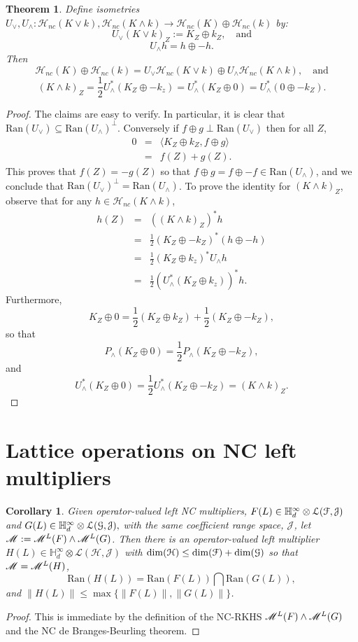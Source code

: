 \documentclass[11pt]{article}
\newcommand{\ba}{\begin{eqnarray}}
\newcommand{\ea}{\end{eqnarray}}
\newcommand{\nn}{\nonumber}
\newcommand{\mr}{\ensuremath{\mathrm}}
\newcommand{\scr}{\ensuremath{\mathscr}}
\newcommand{\mc}{\ensuremath{\mathcal}}
\def\cH{\mathcal{H}}
\def\cG{\mathcal{G}}
\def\bH{\mathbb{H}}
\renewcommand{\H}{\ensuremath{\mathcal{H} }}
\newcommand{\J}{\ensuremath{\mathcal{J} }}
\renewcommand{\L}{\ensuremath{\mathscr{L} }}
\newcommand{\cF}{\ensuremath{\mathcal{F}}}
\newcommand{\ip}[2]{\ensuremath{\langle {#1} , {#2} \rangle}}
\newcommand{\ran}[1]{\ensuremath{\mathrm{Ran} \left( {#1} \right) }}
\numberwithin{equation}{section}
\numberwithin{subsection}{section}
\newtheorem{thm}[subsection]{Theorem}
\newtheorem{cor}[subsection]{Corollary}
\theoremstyle{definition}
\begin{document}
\begin{thm} \label{sumintrkhs}
Define isometries $U _\vee , U _\wedge : \H _{nc} (K \vee k), \H _{nc} (K \wedge k) \rightarrow \H _{nc} (K) \oplus \H _{nc} (k)$ by:
$$ U_\vee (K\vee k)_Z := K_Z \oplus k_Z, \quad \mbox{and} $$ $$ U_\wedge h = h \oplus -h. $$ Then 
$$ \H _{nc} (K) \oplus \H _{nc} (k) = U_\vee \H _{nc} (K \vee k) \oplus U_\wedge \H _{nc} (K \wedge k), \quad \mbox{and}$$  
$$ (K \wedge k )_Z = \frac{1}{2} U_\wedge ^* (K_Z \oplus -k_z) =  U_\wedge ^* (K_Z \oplus 0) =  U_\wedge ^* (0 \oplus -k_Z). $$ 
\end{thm}
\begin{proof}
The claims are easy to verify. In particular, it is clear that $\ran{U_\vee} \subseteq \ran{U_\wedge} ^\perp$. Conversely if $f \oplus g  \perp \ran{U_\vee}$ then for all $Z$,
\ba 0 & = & \ip{K_Z \oplus k_Z}{f \oplus g} \nn \\
& = & f(Z) + g(Z). \nn \ea This proves that $f(Z) = - g(Z)$ so that $f\oplus g = f \oplus -f \in \ran{U_\wedge}$, and we conclude that $\ran{U_\vee} ^\perp = \ran{U_\wedge} $. 
To prove the identity for $(K \wedge k) _Z$, observe that for any $h \in \H _{nc} (K\wedge k)$, 
\ba h(Z) & = & \left( (K \wedge k) _Z \right)^* h \nn \\
& = & \frac{1}{2} \left( K_Z \oplus -k_Z \right) ^* (h \oplus -h) \nn \\
& = & \frac{1}{2} \left( K_Z \oplus k_z \right) ^* U_\wedge h \nn \\
& = & \frac{1}{2} \left(  U_\wedge ^* (K_Z \oplus k_z)  \right) ^* h. \nn \ea 
Furthermore,
$$ K_Z \oplus 0 = \frac{1}{2} (K_Z \oplus k_Z ) + \frac{1}{2} (K_Z \oplus - k_Z), $$ so that
$$ P_\wedge (K_Z \oplus 0) = \frac{1}{2} P_\wedge (K_Z \oplus -k_Z), $$ and 
$$ U_\wedge ^* (K_Z \oplus 0) = \frac{1}{2} U_\wedge ^* (K_Z \oplus -k_Z) = (K\wedge k)_Z. $$ 
\end{proof}

\section{Lattice operations on NC left multipliers} \label{sec:lattice_mult}


\begin{cor}
Given operator-valued left NC multipliers, $F (L) \in \bH ^\infty _d \otimes \mc{L} (\mc{F} , \J) $ and 
$G(L) \in \bH ^\infty _d \otimes \mc{L} (\mc{G} , \J ), $ with the same coefficient range space, $\J$, let $\scr{M} := \scr{M} ^L (F) \wedge \scr{M} ^L (G) $. Then there is an operator-valued left multiplier $H(L) \in \bH ^\infty _d \otimes \L (\H, \J )$ with $\mr{dim} (\cH ) \leq \mr{dim} (\cF) + \mr{dim} (\cG)$ so that $\scr{M} = \scr{M} ^L (H)$,
$$ \ran{H(L)} = \ran{F(L)} \bigcap \ran{G(L)}, $$ and $\| H(L) \| \leq \max \{ \| F(L) \| , \| G( L) \| \} $.
\end{cor}
\begin{proof}
This is immediate by the definition of the NC-RKHS $\scr{M} ^L (F) \wedge \scr{M} ^L (G)$ and the NC de Branges-Beurling theorem. 
\end{proof}
\end{document}
